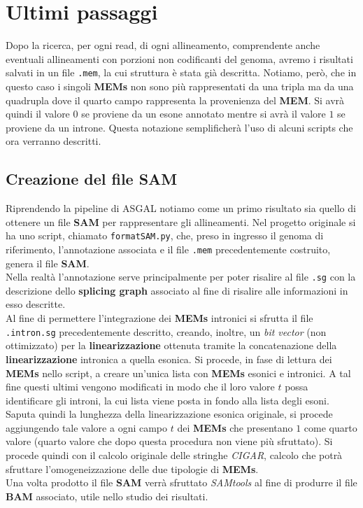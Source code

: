 \documentclass[a4paper,12pt, oneside]{book}
\begin{document}
\section{Ultimi passaggi}
Dopo la ricerca, per ogni read, di ogni allineamento, comprendente anche
eventuali allineamenti con porzioni non codificanti del genoma, avremo i
risultati salvati in un file \texttt{.mem}, la cui struttura è stata già
descritta. Notiamo, però, che in questo caso i singoli \textbf{MEMs} non sono
più rappresentati da una tripla ma da una quadrupla dove il quarto campo
rappresenta la provenienza del \textbf{MEM}. Si avrà quindi il valore $0$ se
proviene da un esone annotato mentre si avrà il valore $1$ se proviene da un
introne. Questa notazione semplificherà l'uso di alcuni scripts che ora verranno
descritti.
\subsection{Creazione del file SAM}
Riprendendo la pipeline di ASGAL notiamo come un primo risultato sia quello di
ottenere un file \textbf{SAM} per rappresentare gli allineamenti. Nel progetto
originale si ha uno script, chiamato \texttt{formatSAM.py}, che, preso in
ingresso il genoma di riferimento, l'annotazione associata e il file
\texttt{.mem} precedentemente costruito, genera il file \textbf{SAM}.\\
Nella realtà l'annotazione serve principalmente per poter risalire al file
\texttt{.sg} con la descrizione dello \textbf{splicing graph} associato al fine
di risalire alle informazioni in esso descritte. \\
Al fine di permettere l'integrazione dei \textbf{MEMs} intronici si sfrutta il
file \texttt{.intron.sg} precedentemente descritto, creando, inoltre, un
\textit{bit vector} (non ottimizzato) per la \textbf{linearizzazione} ottenuta
tramite la concatenazione della \textbf{linearizzazione} intronica a quella
esonica. Si procede, in fase di lettura dei \textbf{MEMs} nello script, a creare
un'unica lista con \textbf{MEMs} esonici e intronici. A tal fine questi ultimi
vengono modificati in modo che il loro valore $t$ possa identificare gli
introni, la cui lista viene posta in fondo alla lista degli esoni. Saputa
quindi la lunghezza della linearizzazione esonica originale, si procede
aggiungendo tale valore a ogni campo $t$ dei \textbf{MEMs} che presentano $1$
come quarto valore (quarto valore che dopo questa procedura non viene più
sfruttato). Si procede quindi con il calcolo originale delle stringhe
\textit{CIGAR}, calcolo che potrà sfruttare l'omogeneizzazione delle due
tipologie di \textbf{MEMs}.\\ 
Una volta prodotto il file \textbf{SAM} verrà sfruttato
\textit{SAMtools} \cite{sam} al fine di produrre il file \textbf{BAM} associato,
utile nello studio dei risultati.
\end{document}
